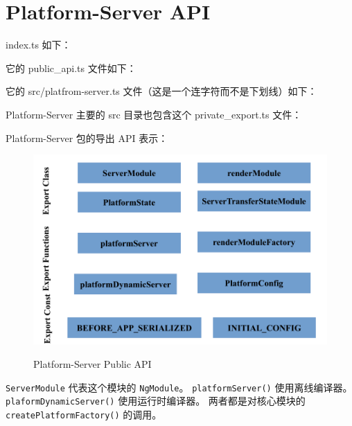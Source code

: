 \section{Platform-Server API}


index.ts 如下：




它的 public\_api.ts 文件如下：




它的 src/platfrom-server.ts 文件（这是一个连字符而不是下划线）如下：




Platform-Server 主要的 src 目录也包含这个 private\_export.ts 文件：




Platform-Server 包的导出 API 表示：

\begin{figure}[!hbt]
  \centering
  \caption{Platform-Server Public API}
  \includegraphics[width=0.75\linewidth]{10_the_platform_server_package/platform_server_public_api}
  \label{fig:platform_server_public_api}
\end{figure}


\texttt{ServerModule} 代表这个模块的 \texttt{NgModule}。
\texttt{platformServer()} 使用离线编译器。
\texttt{plaformDynamicServer()} 使用运行时编译器。
两者都是对核心模块的 \texttt{createPlatformFactory()} 的调用。
